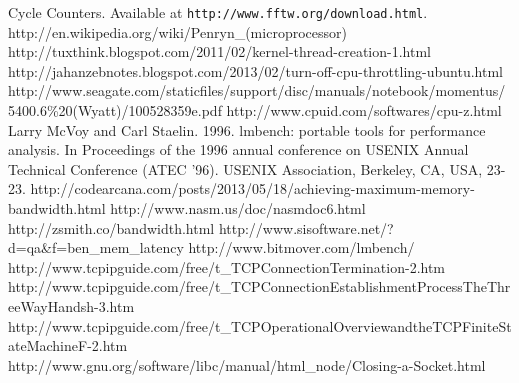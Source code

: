 \documentclass{article} %
\begin{document}
\begin{thebibliography}{1}

   Cycle Counters. Available at {\tt http://www.fftw.org/download.html}.
  \bibitem{}http://en.wikipedia.org/wiki/Penryn\_(microprocessor)
  \bibitem{}http://tuxthink.blogspot.com/2011/02/kernel-thread-creation-1.html
  \bibitem{}http://jahanzebnotes.blogspot.com/2013/02/turn-off-cpu-throttling-ubuntu.html
  \bibitem{}http://www.seagate.com/staticfiles/support/disc/manuals/notebook/momentus/5400.6\%20(Wyatt)/100528359e.pdf
  \bibitem{}http://www.cpuid.com/softwares/cpu-z.html
  \bibitem{}Larry McVoy and Carl Staelin. 1996. lmbench: portable tools for performance analysis. In Proceedings of the 1996 annual conference on USENIX Annual Technical Conference (ATEC '96). USENIX Association, Berkeley, CA, USA, 23-23.
  \bibitem{}http://codearcana.com/posts/2013/05/18/achieving-maximum-memory-bandwidth.html
  \bibitem{}http://www.nasm.us/doc/nasmdoc6.html
  \bibitem{}http://zsmith.co/bandwidth.html
  \bibitem{}http://www.sisoftware.net/?d=qa\&f=ben\_mem\_latency
  \bibitem{}http://www.bitmover.com/lmbench/
  \bibitem{}http://www.tcpipguide.com/free/t\_TCPConnectionTermination-2.htm
  \bibitem{}http://www.tcpipguide.com/free/t\_TCPConnectionEstablishmentProcessTheThreeWayHandsh-3.htm
  \bibitem{}http://www.tcpipguide.com/free/t\_TCPOperationalOverviewandtheTCPFiniteStateMachineF-2.htm
  \bibitem{}http://www.gnu.org/software/libc/manual/html\_node/Closing-a-Socket.html

\end{thebibliography}
\end{document}
